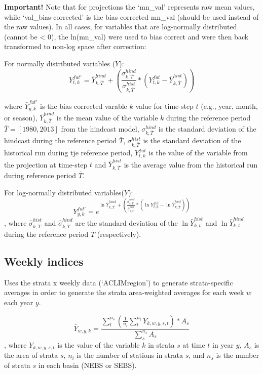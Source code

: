 \documentclass[
]{article}
\begin{document}
\textbf{Important!} Note that for projections the `mn\_val' represents
raw mean values, while `val\_bias-corrected' is the bias corrected
mn\_val (should be used instead of the raw values). In all cases, for
variables that are log-normally distributed (cannot be \textless{} 0),
the ln(mn\_val) were used to bias correct and were then back transformed
to non-log space after correction:

For normally distributed variables (\(Y\)):
\[{Y}^{fut'}_{t,k} =\bar{Y}^{hind}_{k,\bar{T}} +\left( \frac{\sigma^{hind}_{k,\bar{T}}}{\sigma^{hist}_{k,\bar{T}}}*({Y}^{fut}_{t,k}-\bar{Y}^{hist}_{k,\bar{T}})  \right )\]

where \(\bar{Y}^{fut'}_{y,k}\) is the bias corrected varable \(k\) value
for time-step \(t\) (e.g., year, month, or season),
\(\bar{Y}^{hind}_{k,\bar{T}}\) is the mean value of the variable \(k\)
during the reference period \(\bar{T}=[1980,2013]\) from the hindcast
model, \(\sigma^{hind}_{k,\bar{T}}\) is the standard deviation of the
hindcast during the reference period \(\bar{T}\),
\(\sigma^{hist}_{k,\bar{T}}\) is the standard deviation of the
historical run during tje reference period, \({Y}^{fut}_{t,k}\) is the
value of the variable from the projection at time-step \(t\) and
\(\bar{Y}^{hist}_{k,\bar{T}}\) is the average value from the historical
run during reference period \(\bar{T}\).

For log-normally distributed variables(\(Y\)):
\[{Y}^{fut'}_{y,k} =e^{\ln\bar{Y}^{hind}_{k,\bar{T}} +\left( \frac{\hat{\sigma}^{hind}_{k,\bar{T}}}{\hat{\sigma}^{hist}_{k,\bar{T}}}*(\ln{Y}^{fut}_{t,k}-\ln\bar{Y}^{hist}_{k,\bar{T}})  \right )}\],
where \(\hat\sigma^{hist}_{k,\bar{T}}\) and
\(\hat\sigma^{hind}_{k,\bar{T}}\) are the standard deviation of the
\(\ln\bar{Y}^{hist}_{k,t}\) and \(\ln\bar{Y}^{hind}_{k,t}\) during the
reference period \(\hat{T}\) (respectively).

\hypertarget{weekly-indices}{%
\subsection{Weekly indices}\label{weekly-indices}}

Uses the strata x weekly data (`ACLIMregion') to generate
strata-specific averages in order to generate the strata area-weighted
averages for each week \(w\) each year \(y\).

\[\bar{Y}_{w,y,k}= \frac{\sum^{n_s}_{l}(\frac{1}{n_i}\sum^{n_t}_{t}Y_{k,w,y,s,t})*A_s} {\sum^{n_s}_{s}{A_s}}\],
where \(Y_{k,w,y,s,t}\) is the value of the variable \(k\) in strata
\(s\) at time \(t\) in year \(y\), \(A_s\) is the area of strata \(s\),
\(n_i\) is the number of stations in strata \(s\), and \(n_s\) is the
number of strata \(s\) in each basin (NEBS or SEBS).
\end{document}
